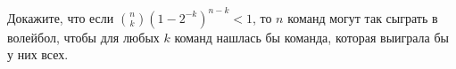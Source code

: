 Докажите, что если $\binom{n}{k} (1 - 2^{-k})^{n - k} < 1$, то $n$ команд могут так сыграть в волейбол,
чтобы для любых $k$ команд нашлась бы команда, которая выиграла бы у них всех.
